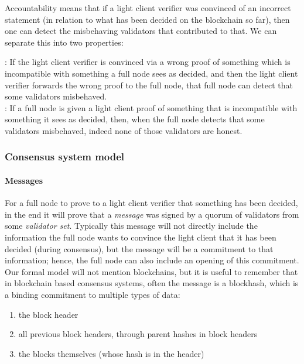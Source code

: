 \noindent  Accountability means that if a light client verifier was convinced of an incorrect statement (in relation to what has been decided on the blockchain so far), 
then one can detect the misbehaving validators that contributed to that. We can separate this into two properties: %

: If the light client verifier is convinced via a wrong proof of something which is incompatible 
with something a full node sees as decided, and then the light client verifier forwards the wrong proof to the full node, that full node can detect that some validators misbehaved. \\

: If a full node is given a light client proof of something that is incompatible with something it sees as decided,
 then, when the full node detects that some validators misbehaved, indeed none of those validators are honest. \\

\subsubsection{Consensus system model}

\paragraph{Messages} For a full node to prove to a light client verifier that something has been decided, in the end it will prove that a {\it message} was signed by a quorum of validators from some {\it validator set}. 
Typically this message will not directly include the information the full node wants to convince the light client that it has been decided (during consensus), 
but the message will be a commitment to that information; hence, the full node can also include an opening of this commitment. \\
 
\noindent Our formal model will not mention blockchains, but it is useful to remember that in blockchain based consensus systems, often the message is a blockhash, which is a binding commitment to multiple types of data: 

\begin{enumerate}
\item the block header
\item all previous block headers, through parent hashes in block headers
\item the blocks themselves (whose hash is in the header)
\end{enumerate}

